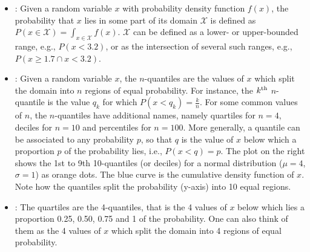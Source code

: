 \documentclass[draftspec]{sbmlpkgspec}
\begin{document}
\begin{itemize}
\item {}:  Given a random variable $ x $ with probability density function $ f(x) $, the probability that $ x $ lies in some part of its domain $ \mathcal{X} $ is defined as $ P(x \in \mathcal{X}) = \int_{x\in\mathcal{X}} f(x) $. $ \mathcal{X} $ can be defined as a lower- or upper-bounded range, e.g., $ P(x < 3.2) $, or as the intersection of several such ranges, e.g., $ P(x \geq 1.7 \cap x < 3.2) $.

\item {}:  Given a random variable $ x $, the $ n $-quantiles are the values of $ x $ which split the domain into $ n $ regions of equal probability. For instance, the $ k\textsuperscript{th} $ $ n $-quantile is the value $ q_k $ for which $ P(x<q_k) = \frac{k}{n} $. For some common values of $ n $, the $ n $-quantiles have additional names, namely quartiles for $ n=4 $, deciles for $ n=10 $ and percentiles for $ n=100 $.
More generally, a quantile can be associated to any probability $ p $, so that $ q $ is the value of $ x $ below which a proportion $ p $ of the probability lies, i.e., $ P(x<q) = p $.
The plot on the right shows the 1st to 9th 10-quantiles (or deciles) for a normal distribution ($ \mu = 4 $, $ \sigma = 1 $) as orange dots. The blue curve is the cumulative density function of $ x $. Note how the quantiles split the probability (y-axis) into 10 equal regions.

\item {}:  The quartiles are the 4-quantiles, that is the 4 values of $ x $ below which lies a proportion 0.25, 0.50, 0.75 and 1 of the probability. One can also think of them as the 4 values of $ x $ which split the domain into 4 regions of equal probability.
\end{itemize}
\end{document}
